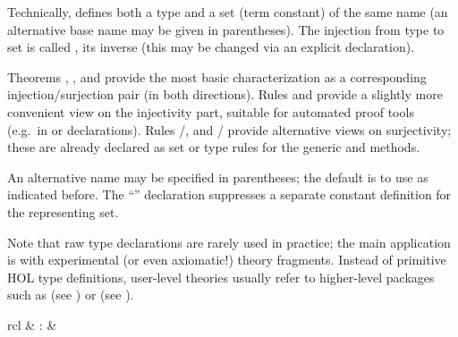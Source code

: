 \begin{isabellebody}
\begin{isamarkuptext}
\begin{descr}
  Technically, \hyperlink{command.HOL.typedef}{\mbox{}} defines both a type  and a set (term constant) of the same name (an alternative base
  name may be given in parentheses).  The injection from type to set
  is called , its inverse  (this may be
  changed via an explicit \hyperlink{keyword.HOL.morphisms}{\mbox{}} declaration).
  
  Theorems , , and  provide the most basic characterization as a
  corresponding injection/surjection pair (in both directions).  Rules
   and  provide a slightly
  more convenient view on the injectivity part, suitable for automated
  proof tools (e.g.\ in \hyperlink{attribute.simp}{\mbox{}} or \hyperlink{attribute.iff}{\mbox{}}
  declarations).  Rules /, and
  / provide alternative views
  on surjectivity; these are already declared as set or type rules for
  the generic \hyperlink{method.cases}{\mbox{}} and \hyperlink{method.induct}{\mbox{}} methods.
  
  An alternative name may be specified in parentheses; the default is
  to use  as indicated before.  The ``''
  declaration suppresses a separate constant definition for the
  representing set.

  \end{descr}

  Note that raw type declarations are rarely used in practice; the
  main application is with experimental (or even axiomatic!) theory
  fragments.  Instead of primitive HOL type definitions, user-level
  theories usually refer to higher-level packages such as \hyperlink{command.HOL.record}{\mbox{}} (see ) or \hyperlink{command.HOL.datatype}{\mbox{}} (see ).%
\end{isamarkuptext}%
\isamarkuptrue%
%
\isamarkuptrue%
%
\begin{isamarkuptext}%
\begin{matharray}{rcl}
    \hyperlink{attribute.HOL.split-format}{\mbox{}}\isa{{\isachardoublequote}\isactrlsup {\isacharasterisk}{\isachardoublequote}} & : & \isaratt \\
  \end{matharray}


\end{isamarkuptext}
\end{isabellebody}
